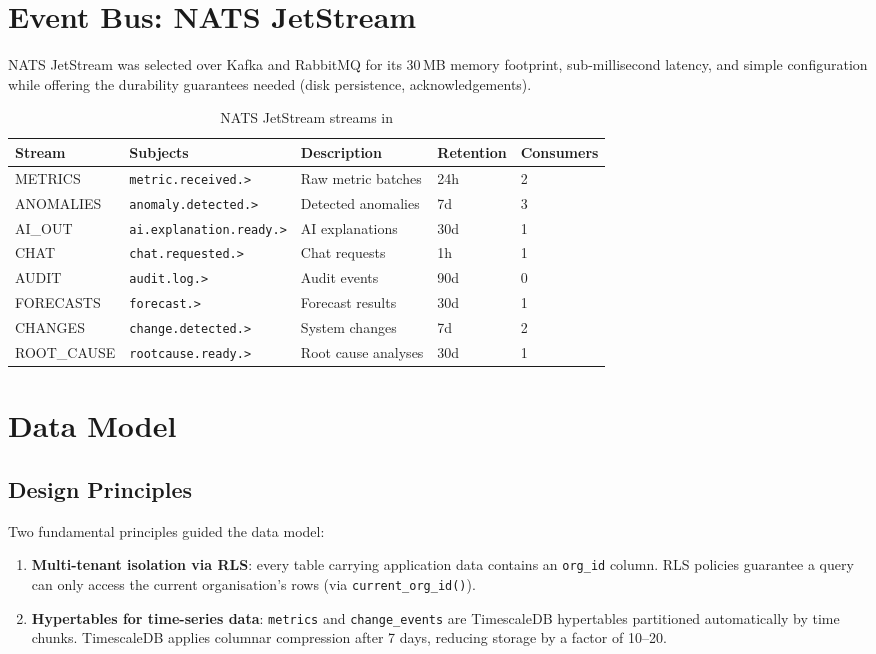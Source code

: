 \section{Event Bus: NATS JetStream}

NATS JetStream \cite{nats_docs} was selected over Kafka and RabbitMQ for
its 30\,MB memory footprint, sub-millisecond latency, and simple configuration
while offering the durability guarantees needed (disk persistence, acknowledgements).

\begin{table}[H]
\centering
\caption{NATS JetStream streams in \caimp{}}
\label{tab:nats-streams}
\small
\begin{tabularx}{\textwidth}{llXll}
\toprule
\textbf{Stream} & \textbf{Subjects} & \textbf{Description} & \textbf{Retention} & \textbf{Consumers} \\
\midrule
METRICS     & \texttt{metric.received.>}       & Raw metric batches          & 24h  & 2 \\
ANOMALIES   & \texttt{anomaly.detected.>}      & Detected anomalies          & 7d   & 3 \\
AI\_OUT     & \texttt{ai.explanation.ready.>}  & AI explanations             & 30d  & 1 \\
CHAT        & \texttt{chat.requested.>}        & Chat requests               & 1h   & 1 \\
AUDIT       & \texttt{audit.log.>}             & Audit events                & 90d  & 0 \\
FORECASTS   & \texttt{forecast.>}              & Forecast results            & 30d  & 1 \\
CHANGES     & \texttt{change.detected.>}       & System changes              & 7d   & 2 \\
ROOT\_CAUSE & \texttt{rootcause.ready.>}       & Root cause analyses         & 30d  & 1 \\
\bottomrule
\end{tabularx}
\end{table}

\section{Data Model}

\subsection{Design Principles}

Two fundamental principles guided the data model:
\begin{enumerate}
  \item \textbf{Multi-tenant isolation via RLS}: every table carrying application
    data contains an \texttt{org\_id} column. RLS policies guarantee a query can
    only access the current organisation's rows (via \texttt{current\_org\_id()}).
  \item \textbf{Hypertables for time-series data}: \texttt{metrics} and
    \texttt{change\_events} are TimescaleDB hypertables partitioned automatically
    by time chunks. TimescaleDB applies columnar compression after 7 days,
    reducing storage by a factor of 10--20.
\end{enumerate}

